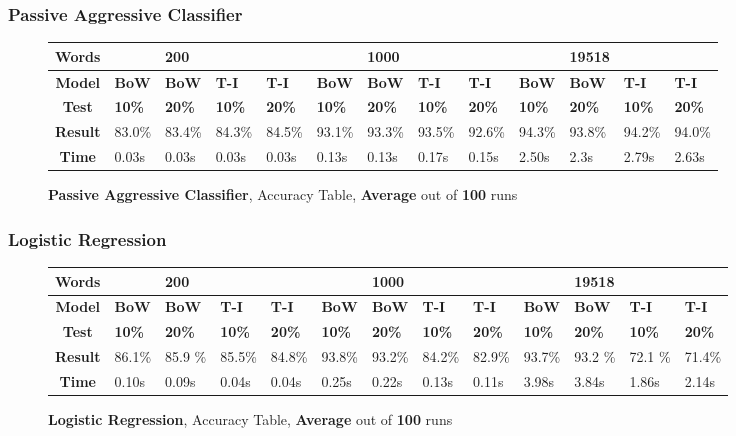 \documentclass{article}
\begin{document}
	\subsubsection{Passive Aggressive Classifier}
	\begin{figure}[!h]
		\begin{tabular}{||c||l|l|l|l||l|l|l|l||l|l|l|l||}
			\hline
			\textbf{Words} &  & \textbf{200} & & & &\textbf{1000} & & & & \textbf{19518} &  & \\ \hline 
			\textbf{Model} & \textbf{BoW} & \textbf{BoW} & \textbf{T-I} & \textbf{T-I} &\textbf{BoW} & \textbf{BoW} & \textbf{T-I} & \textbf{T-I} & \textbf{BoW} & \textbf{BoW} & \textbf{T-I} & \textbf{T-I}\\ \hline
			\textbf{Test} & \textbf{10\%} & \textbf{20\%} & \textbf{10\%} & \textbf{20\%} & \textbf{10\%} & \textbf{20\%} & \textbf{10\%} & \textbf{20\%} & \textbf{10\%} & \textbf{20\%} & \textbf{10\%} & \textbf{20\%} \\ \hline \hline  
			\textbf{Result} & 83.0\% & 83.4\% & 84.3\% & 84.5\% & 93.1\% & 93.3\% & 93.5\% & 92.6\% & 94.3\% & 93.8\% & 94.2\% & 94.0\% \\ \hline 
			\textbf{Time} & 0.03s & 0.03s & 0.03s & 0.03s & 0.13s & 0.13s & 0.17s & 0.15s & 2.50s & 2.3s & 2.79s & 2.63s \\ \hline 
		\end{tabular}
		\caption{\textbf{Passive Aggressive Classifier}, Accuracy Table, \textbf{Average} out of \textbf{100} runs}
	\end{figure}    
    
	\subsubsection{Logistic Regression}
	\begin{figure}[!h]
		\begin{tabular}{||c||l|l|l|l||l|l|l|l||l|l|l|l||}
			\hline
			\textbf{Words} &  & \textbf{200} & & & &\textbf{1000} & & & & \textbf{19518} &  & \\ \hline 
			\textbf{Model} & \textbf{BoW} & \textbf{BoW} & \textbf{T-I} & \textbf{T-I} &\textbf{BoW} & \textbf{BoW} & \textbf{T-I} & \textbf{T-I} & \textbf{BoW} & \textbf{BoW} & \textbf{T-I} & \textbf{T-I}\\ \hline
			\textbf{Test} & \textbf{10\%} & \textbf{20\%} & \textbf{10\%} & \textbf{20\%} & \textbf{10\%} & \textbf{20\%} & \textbf{10\%} & \textbf{20\%} & \textbf{10\%} & \textbf{20\%} & \textbf{10\%} & \textbf{20\%} \\ \hline \hline  
			\textbf{Result} & 86.1\% &85.9 \% & 85.5\% & 84.8\% &93.8\% &93.2\% &84.2\% & 82.9\% & 93.7\% &93.2 \% &72.1 \% &71.4\% \\ \hline 
			\textbf{Time} & 0.10s & 0.09s & 0.04s & 0.04s & 0.25s & 0.22s & 0.13s &0.11s & 3.98s & 3.84s & 1.86s & 2.14s \\ \hline 
		\end{tabular}
		\caption{\textbf{Logistic Regression}, Accuracy Table, \textbf{Average} out of \textbf{100} runs}
	\end{figure} 
\end{document}

